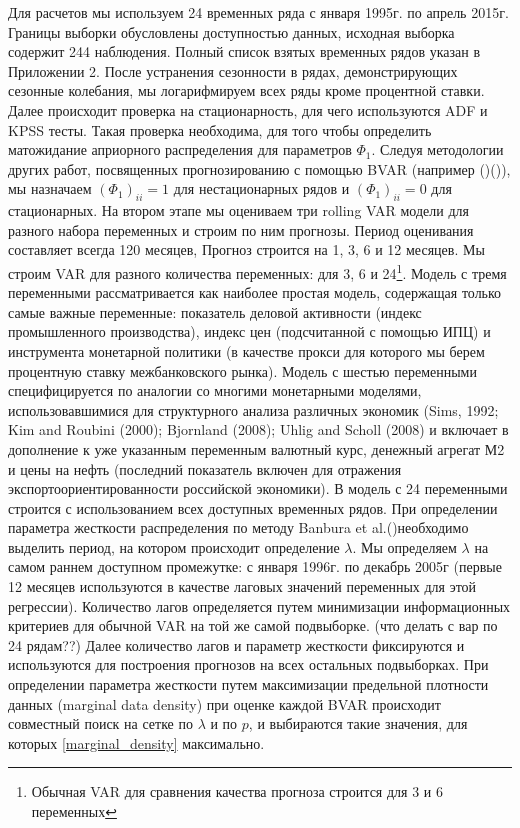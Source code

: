 \documentclass[11pt]{article} %
\begin{document}
Для расчетов мы используем 24 временных ряда с января 1995г. по апрель 2015г. Границы выборки обусловлены доступностью данных, исходная выборка содержит 244 наблюдения. Полный список взятых временных рядов указан в Приложении 2. После устранения сезонности в рядах, демонстрирующих сезонные колебания, мы логарифмируем всех ряды кроме процентной ставки. Далее происходит проверка на стационарность, для чего используются ADF и KPSS тесты. Такая проверка необходима, для того чтобы определить матожидание априорного  распределения для параметров $\Phi_1$. Следуя методологии других работ, посвященных прогнозированию с помощью BVAR (например ()()), мы назначаем $(\Phi_1)_{ii}=1$  для  нестационарных рядов и $(\Phi_1)_{ii}=0$ для стационарных. 
На втором этапе мы оцениваем три rolling VAR модели для разного набора переменных и строим по ним прогнозы. Период  оценивания составляет всегда 120 месяцев, Прогноз строится на 1, 3, 6 и 12 месяцев.  Мы строим VAR  для разного количества переменных: для 3, 6 и 24\footnote{Обычная VAR для сравнения качества прогноза строится для 3 и 6 переменных}. Модель с тремя переменными рассматривается как наиболее простая модель, содержащая только самые важные  переменные: показатель деловой активности (индекс промышленного производства),  индекс цен (подсчитанной с помощью ИПЦ) и  инструмента монетарной политики (в качестве прокси для которого мы берем процентную ставку межбанковского рынка). Модель с шестью переменными специфицируется по аналогии со многими монетарными моделями, использовавшимися для структурного анализа различных экономик (Sims, 1992; Kim and Roubini (2000); Bjornland (2008); Uhlig and Scholl (2008) и включает  в дополнение к уже указанным переменным валютный курс, денежный агрегат М2 и цены на нефть (последний показатель включен для отражения экспортоориентированности российской экономики). В модель с 24 переменными строится с использованием всех доступных временных рядов. 
При определении параметра жесткости распределения по методу Banbura et al.()необходимо выделить период, на котором происходит определение $\lambda$. Мы определяем $\lambda$ на самом раннем доступном промежутке: с января 1996г. по декабрь 2005г (первые 12 месяцев используются в качестве лаговых значений переменных для этой регрессии). Количество лагов определяется путем минимизации информационных критериев для обычной VAR на той же самой подвыборке. (что делать с вар по 24 рядам??) Далее количество лагов и параметр жесткости фиксируются и используются для построения прогнозов на всех остальных подвыборках. 
При определении параметра жесткости путем максимизации предельной плотности данных (marginal data density) при оценке каждой BVAR происходит совместный поиск на сетке по $\lambda$ и по $p$, и выбираются такие значения, для которых \eqref{marginal_density} максимально.  
\newpage
\end{document}
